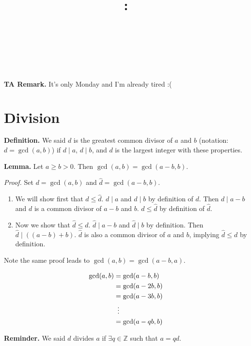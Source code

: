 \documentclass{article}
\title{
    \vspace{2in}
    \textbf{\lectClass:\\ \lectTitle}\\
    \vspace{0.1in}\large{\textit{\lectClassInstructor\ \lectSection}}
    \vspace{3in}
    \author{\textbf{\lectAuthorName}}
    \date{}
}
\begin{document}
\maketitle
\pagebreak

\textbf{TA Remark.} It's only Monday and I'm already tired :(

\section*{Division}
    \textbf{Definition. } We said $d$ is the greatest common divisor of $a$ and $b$ (notation: $d = \gcd(a, b)$) if $d \mid a$, $d \mid b$, and $d$ is the largest integer with these properties.
    
    \vspace{1.5mm}
    \textbf{Lemma.} Let $a \ge b > 0$. Then $\gcd(a, b) = \gcd(a - b, b)$.
    
    \vspace{1.5mm}
    \textit{Proof. } Set $d = \gcd(a, b)$ and $\hat{d} = \gcd(a - b, b)$.
    \begin{enumerate}[label = \arabic*.]
        \item We will show first that $d \le \hat{d}$. $d \mid a$ and $d \mid b$ by definition of $d$. Then $d \mid a - b$ and $d$ is a common divisor of $a - b$ and $b$. $d \le \hat{d}$ by definition of $\hat{d}$.
        \item Now we show that $\hat{d} \le d$. $\hat{d} \mid a - b$ and $\hat{d} \mid b$ by definition. Then $\hat{d} \mid ((a - b) + b)$. $\hat{d}$ is also a common divisor of $a$ and $b$, implying $\hat{d} \le d$ by definition.
    \end{enumerate}
    Note the same proof leads to $\gcd(a, b) = \gcd(a - b, a)$.
    
    
    $$\begin{aligned}[t]
        \gcd(a, b) &= \gcd(a - b, b) \\
        &= \gcd(a - 2b, b) \\
        &= \gcd(a - 3b, b) \\
        &\vdotswithin{ = } \\
        &= \gcd(a - qb, b)
    \end{aligned}$$
    
    \textbf{Reminder.} We said $d$ divides $a$ if $\exists q \in \mathbb{Z}$ such that $a = qd$. 
    
\end{document}
